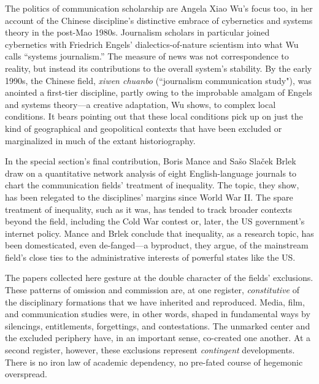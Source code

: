 \documentclass{tufte-handout}
\begin{document}
The politics of communication scholarship are Angela Xiao Wu's focus
too, in her account of the Chinese discipline's distinctive embrace of
cybernetics and systems theory in the post-Mao 1980s. Journalism
scholars in particular joined cybernetics with Friedrich Engels'
dialectics-of-nature scientism into what Wu calls ``systems
journalism.'' The measure of news was not correspondence to reality, but
instead its contributions to the overall system's stability. By the
early 1990s, the Chinese field, \emph{xiwen chuanbo} (``journalism
communication study"), was anointed a first-tier discipline, partly
owing to the improbable amalgam of Engels and systems theory---a
creative adaptation, Wu shows, to complex local conditions. It bears
pointing out that these local conditions pick up on just the kind of
geographical and geopolitical contexts that have been excluded or
marginalized in much of the extant historiography.

In the special section's final contribution, Boris Mance and Sašo Slaček
Brlek draw on a quantitative network analysis of eight English-language
journals to chart the communication fields' treatment of inequality. The
topic, they show, has been relegated to the disciplines' margins since
World War II. The spare treatment of inequality, such as it was, has
tended to track broader contexts beyond the field, including the Cold
War contest or, later, the US government's internet policy. Mance and
Brlek conclude that inequality, as a research topic, has been
domesticated, even de-fanged---a byproduct, they argue, of the
mainstream field's close ties to the administrative interests of
powerful states like the US.

The papers collected here gesture at the double character of the fields'
exclusions. These patterns of omission and commission are, at one
register, \emph{constitutive} of the disciplinary formations that we
have inherited and reproduced. Media, film, and communication studies
were, in other words, shaped in fundamental ways by silencings,
entitlements, forgettings, and contestations. The unmarked center and
the excluded periphery have, in an important sense, co-created one
another. At a second register, however, these exclusions represent
\emph{contingent} developments. There is no iron law of academic
dependency, no pre-fated course of hegemonic overspread.
\end{document}
